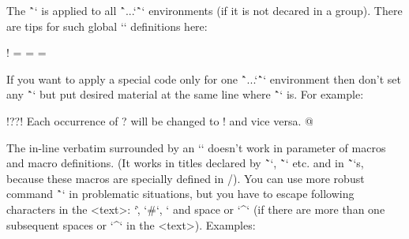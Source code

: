The \^`\everytt` is applied to all \^`\begtt...`\^`\endtt` environments (if it is not
decared in a group). There are tips for such global `\everytt` definitions here:

\begtt \adef!{ }
\everytt={\typosize[9/11]}  %
\everytt={}        %
\everytt={\visiblesp}       %
\endtt

\new
If you want to apply a special code only for one \^`\begtt...`\^`\endtt`
environment then don't set any \^`\everytt` but put desired material at the 
same line where \^`\begtt` is. For example:

\begtt   \adef@{\string\endtt}
\begtt   \adef!{?}\adef?{!}
Each occurrence of ? will be changed to ! and vice versa. 
@
\endtt

The in-line verbatim surrounded by an `\activettchar` doesn't work in
parameter of macros and macro definitions. (It works in titles declared by
\~`\chap`, \~`\sec` etc. and in \~`\fnote`s, because these macros are
specially defined in \OpTeX/).
\new
You can use more robust command \^`` in problematic
situations, but you have to escape following characters in the <text>:
`\`, `#`, `%
and space or `^` (if there are more than one subsequent spaces or `^` in 
the <text>). Examples:

